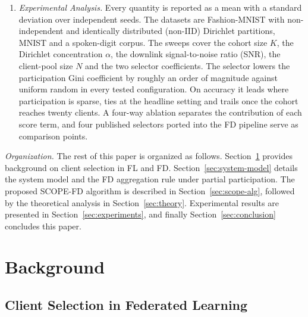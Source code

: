 \documentclass[journal]{IEEEtran}
\newcommand{\rev}[1]{{\color{blue}#1}}
\begin{document}
\begin{enumerate}
    \item \textit{Experimental Analysis.} \rev{Every quantity is reported as a mean with a standard deviation over independent seeds. The datasets are Fashion-MNIST with non-independent and identically distributed (non-IID) Dirichlet partitions, MNIST and a spoken-digit corpus. The sweeps cover the cohort size $K$, the Dirichlet concentration $\alpha$, the downlink signal-to-noise ratio (SNR), the client-pool size $N$ and the two selector coefficients. The selector lowers the participation Gini coefficient by roughly an order of magnitude against uniform random in every tested configuration. On accuracy it leads where participation is sparse, ties at the headline setting and trails once the cohort reaches twenty clients. A four-way ablation separates the contribution of each score term, and four published selectors ported into the FD pipeline serve as comparison points.}
\end{enumerate}


\textit{Organization.} The rest of this paper is organized as follows. Section~\ref{sec:related-work} provides background on client selection in FL and FD. Section~\ref{sec:system-model} details the system model and the FD aggregation rule under partial participation. The proposed SCOPE-FD algorithm is described in Section~\ref{sec:scope-alg}, followed by the theoretical analysis in Section~\ref{sec:theory}. Experimental results are presented in Section~\ref{sec:experiments}, and finally Section~\ref{sec:conclusion} concludes this paper.

\section{Background}
\label{sec:related-work}

\subsection{Client Selection in Federated Learning}
\label{ssec:rw-fl-selection}
\end{document}
